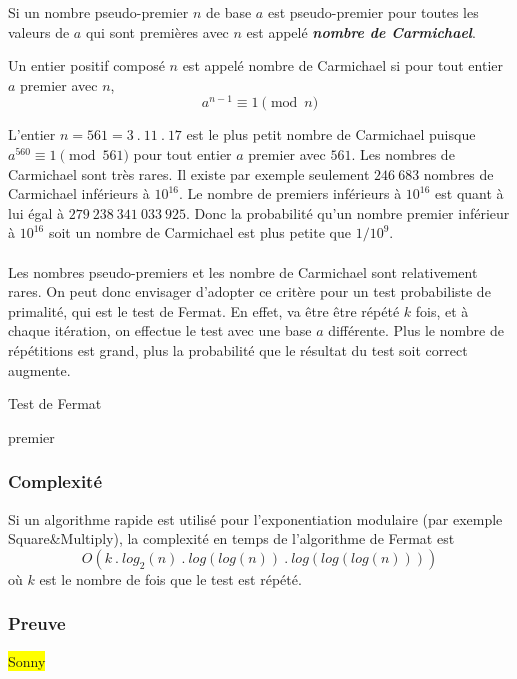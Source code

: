 \begin{itemize}
				Si un nombre pseudo-premier $n$ de base $a$ est pseudo-premier pour toutes les valeurs de $a$ qui sont premières avec $n$ est appelé \textit{\textbf{nombre de Carmichael}}. 
			
					\vspace{-1.5em}\begin{adjustwidth}{1.5cm}{1.5cm} 
					\begin{Def}
						\label{Carmich}
						Un entier positif composé $n$ est appelé nombre de Carmichael si pour tout entier $a$ premier avec $n$,
						\[a^{n-1}\equiv 1 \pmod n\]
					\end{Def}
					\end{adjustwidth}\vspace{0.5em}
					
				L'entier $n = 561 = 3\ .\ 11\ .\ 17$ est le plus petit nombre de Carmichael puisque $a^{560} \equiv 1 \pmod 561$ pour tout entier $a$ premier avec $561$. Les nombres de Carmichael sont très rares. Il existe par exemple seulement $246\ 683$ nombres de Carmichael inférieurs à $10^{16}$. Le nombre de premiers inférieurs à $10^{16}$ est quant à lui égal à $279\ 238\ 341\ 033\ 925$. Donc la probabilité qu'un nombre premier inférieur à $10^{16}$ soit un nombre de Carmichael est plus petite que $1/10^{9}$.
			
		\end{itemize}
		
		\paragraph{}Les nombres pseudo-premiers et les nombre de Carmichael sont relativement rares. On peut donc envisager d'adopter ce critère pour un test probabiliste de primalité, qui est le test de Fermat. En effet, va être être répété $k$ fois, et à chaque itération, on effectue le test avec une base $a$ différente. Plus le nombre de répétitions est grand, plus la probabilité que le résultat du test soit correct augmente.\\
		
		\begin{algorithm}[H]
			\caption{Test de Fermat}\label{TF}
		\Retour premier\;
		\end{algorithm}
		
		
	\subsubsection{Complexité}
		Si un algorithme rapide est utilisé pour l'exponentiation modulaire (par exemple Square\&Multiply), la complexité en temps de l'algorithme de Fermat est
		\[O(k\ .\ log_{2}(n)\ .\ log(log(n))\ .\ log(log(log(n))))\]
		où $k$ est le nombre de fois que le test est répété.
	
	
	\subsubsection{Preuve}
		\colorbox{yellow}{Sonny}